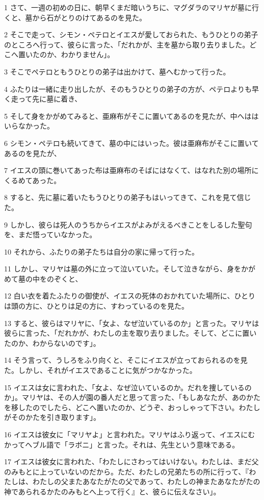 \par 1 さて、一週の初めの日に、朝早くまだ暗いうちに、マグダラのマリヤが墓に行くと、墓から石がとりのけてあるのを見た。
\par 2 そこで走って、シモン・ペテロとイエスが愛しておられた、もうひとりの弟子のところへ行って、彼らに言った、「だれかが、主を墓から取り去りました。どこへ置いたのか、わかりません」。
\par 3 そこでペテロともうひとりの弟子は出かけて、墓へむかって行った。
\par 4 ふたりは一緒に走り出したが、そのもうひとりの弟子の方が、ペテロよりも早く走って先に墓に着き、
\par 5 そして身をかがめてみると、亜麻布がそこに置いてあるのを見たが、中へははいらなかった。
\par 6 シモン・ペテロも続いてきて、墓の中にはいった。彼は亜麻布がそこに置いてあるのを見たが、
\par 7 イエスの頭に巻いてあった布は亜麻布のそばにはなくて、はなれた別の場所にくるめてあった。
\par 8 すると、先に墓に着いたもうひとりの弟子もはいってきて、これを見て信じた。
\par 9 しかし、彼らは死人のうちからイエスがよみがえるべきことをしるした聖句を、まだ悟っていなかった。
\par 10 それから、ふたりの弟子たちは自分の家に帰って行った。
\par 11 しかし、マリヤは墓の外に立って泣いていた。そして泣きながら、身をかがめて墓の中をのぞくと、
\par 12 白い衣を着たふたりの御使が、イエスの死体のおかれていた場所に、ひとりは頭の方に、ひとりは足の方に、すわっているのを見た。
\par 13 すると、彼らはマリヤに、「女よ、なぜ泣いているのか」と言った。マリヤは彼らに言った、「だれかが、わたしの主を取り去りました。そして、どこに置いたのか、わからないのです」。
\par 14 そう言って、うしろをふり向くと、そこにイエスが立っておられるのを見た。しかし、それがイエスであることに気がつかなかった。
\par 15 イエスは女に言われた、「女よ、なぜ泣いているのか。だれを捜しているのか」。マリヤは、その人が園の番人だと思って言った、「もしあなたが、あのかたを移したのでしたら、どこへ置いたのか、どうぞ、おっしゃって下さい。わたしがそのかたを引き取ります」。
\par 16 イエスは彼女に「マリヤよ」と言われた。マリヤはふり返って、イエスにむかってヘブル語で「ラボニ」と言った。それは、先生という意味である。
\par 17 イエスは彼女に言われた、「わたしにさわってはいけない。わたしは、まだ父のみもとに上っていないのだから。ただ、わたしの兄弟たちの所に行って、『わたしは、わたしの父またあなたがたの父であって、わたしの神またあなたがたの神であられるかたのみもとへ上って行く』と、彼らに伝えなさい」。
